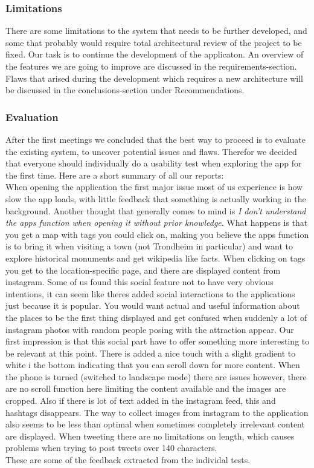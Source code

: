		\subsubsection{Limitations}
There are some limitations to the system that needs to be further developed, and some that probably would require total architectural review of the project to be fixed. Our task is to continue the development of the applicaton. An overview of the features we are going to improve are discussed in the requirements-section. Flaws that arised during the development which requires a new architecture will be discussed in the conclusions-section under Recommendations.

		\subsubsection{Evaluation}
		
After the first meetings we concluded that the best way to proceed is to evaluate the existing system, to uncover potential issues and flaws.
Therefor we decided that everyone should individually do a usability test when exploring the app for the first time. Here are a short summary of all our reports:\\[3pt]

When opening the application the first major issue most of us experience is how slow the app loads, with little feedback that something is actually working in the background. Another thought that generally comes to mind is \emph{I don't understand the apps function when opening it without prior knowledge}. What happens is that you get a map with tags you could click on, making you believe the apps function is to bring it when visiting a town (not Trondheim in particular) and want to explore historical monuments and get wikipedia like facts. When clicking on tags you get to the location-specific page, and there are displayed content from instagram. Some of us found this social feature not to have very obvious intentions, it can seem like theres added social interactions to the applications just because it is popular. You would want actual and useful information about the places to be the first thing displayed and get confused when suddenly a lot of instagram photos with random people posing with the attraction appear. Our first impression is that this social part have to offer something more interesting to be relevant at this point. There is added a nice touch with a slight gradient to white i the bottom indicating that you can scroll down for more content. When the phone is turned (switched to landscape mode) there are issues however, there are no scroll function here limiting the content available and the images are cropped. Also if there is lot of text added in the instagram feed, this and hashtags disappears. The way to collect images from instagram to the application also seems to be less than optimal when sometimes completely irrelevant content are displayed. When tweeting there are no limitations on length, which causes problems when trying to post tweets over 140 characters.\\
These are some of the feedback extracted from the individal tests. 

